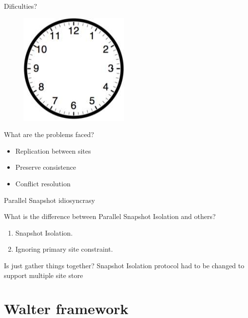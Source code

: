 \documentclass{beamer}
\begin{document}
		\begin{frame}{Dificulties?}
		
		\begin{figure} [H]
			\centering
			\includegraphics[scale=0.40]{img/fig_clock}
		\end{figure}			
		
		What are the problems faced?		
		
		\begin{itemize}[<+->]
		\item Replication between sites
		\item Preserve consistence		
		\item Conflict resolution
		\end{itemize}
		
		\end{frame}		
	
		\begin{frame}{Parallel Snapshot idiosyncrasy}

			What is the difference between Parallel Snapshot Isolation and others?
			\begin{enumerate}
			\item Snapshot Isolation. %
			\item Ignoring primary site constraint. %
			\end{enumerate}

			\pause

			\begin{alertblock}{Is just gather things together?}
				Snapshot Isolation protocol had to be changed to support multiple site store
			\end{alertblock}
						
		\end{frame}		

\section{Walter framework}
\end{document}

